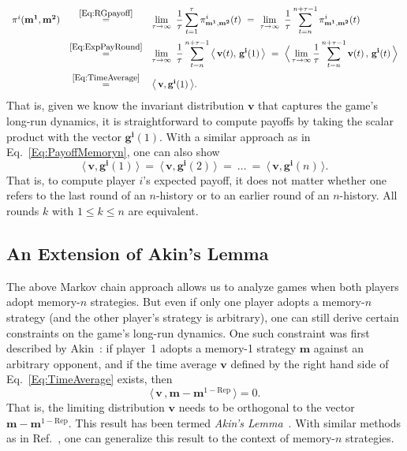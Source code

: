 \documentclass[11pt]{article}
\theoremstyle{plainCl1}
\theoremstyle{plainCl2}
\begin{document}
\begin{equation} \label{Eq:PayoffMemoryn}
\begin{array}{rcl}
\pi^i(\mathbf{m^1},\mathbf{m^2}) 
&\stackrel{\mbox{\small \eqref{Eq:RGpayoff}}}{=}  
&\displaystyle \lim_{\tau \to \infty}~ \frac{1}{\tau} \sum_{t=1}^{\tau} \pi^i_{\mathbf{m^1},\mathbf{m^2}}(t)
~=~
\lim_{\tau \to \infty}~ \frac{1}{\tau} \sum_{t=n}^{n+\tau-1} \pi^i_{\mathbf{m^1},\mathbf{m^2}}(t)\\[0.5cm]
&\stackrel{\mbox{\small \eqref{Eq:ExpPayRound}}}{=}  
&\displaystyle \lim_{\tau \to \infty}~ \frac{1}{\tau} \sum_{t=n}^{n+\tau-1}\big\langle \,\mathbf{v}(t),\, \mathbf{g^i}(1)\,\big\rangle
~=~
\Big\langle \lim_{\tau \to \infty} \frac{1}{\tau} \sum_{t=n}^{n+\tau-1} \mathbf{v}(t)\, , \, \mathbf{g^i}(t)\,\Big\rangle\\[0.5cm]
&\stackrel{\mbox{\small \eqref{Eq:TimeAverage}}}{=}  
&\big\langle\, \mathbf{v}, \mathbf{g^i}(1)\,\big\rangle .
\end{array}
\end{equation}
That is, given we know the invariant distribution $\mathbf{v}$ that captures the game's long-run dynamics, it is straightforward to compute payoffs by taking the scalar product with the vector $\mathbf{g^i}(1)$.
With a similar approach as in Eq.~\eqref{Eq:PayoffMemoryn}, one can also show
\begin{equation} \label{Eq:EquivalencePayoff}
\big\langle\, \mathbf{v}, \mathbf{g^i}(1)\,\big\rangle  
~=~ \big\langle\, \mathbf{v}, \mathbf{g^i}(2)\,\big\rangle
~=~ \ldots
~=~ \big\langle\, \mathbf{v}, \mathbf{g^i}(n)\,\big\rangle.
\end{equation}
That is, to compute player $i$'s expected payoff, it does not matter whether one refers to the last round of an $n$-history or to an earlier round of an $n$-history. All rounds $k$ with $1\!\le\! k\! \le \! n$ are equivalent.



\subsection{An Extension of Akin's Lemma}
The above Markov chain approach allows us to analyze games when both players adopt memory-$n$ strategies. 
But even if only one player adopts a memory-$n$ strategy (and the other player's strategy is arbitrary), one can still  derive certain constraints on the game's long-run dynamics. 
One such constraint was first described by Akin~\citep{akin:EGADS:2016}: 
if player~1 adopts a memory-1 strategy $\mathbf{m}$ against an arbitrary opponent, and if the time average $\mathbf{v}$ defined by the right hand side of Eq.~\eqref{Eq:TimeAverage} exists, then
\begin{equation}
\big\langle\, \mathbf{v}\, , \mathbf{m}-\mathbf{m}^{1-\text{Rep}}\,\big\rangle = 0. 
\end{equation}
That is, the limiting distribution $\mathbf{v}$ needs to be orthogonal to the vector $\mathbf{m}-\mathbf{m}^{1-\text{Rep}}$. 
This result has been termed {\it Akin's Lemma}~\citep{hilbe:PNAS:2014b}. 
With similar methods as in Ref.~\citep{akin:EGADS:2016}, one can generalize this result to the context of memory-$n$ strategies. 
\end{document}
